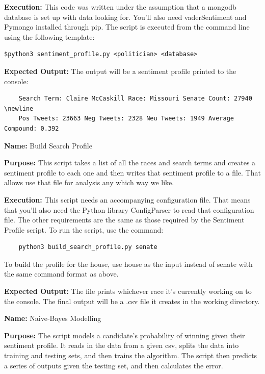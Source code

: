\documentclass[11pt, twoside, reqno]{book}
\begin{document}
\begin{appendices}
\textbf{Execution:} This code was written under the assumption that a mongodb database is set up with data looking for. You'll also need vaderSentiment and Pymongo installed through pip. The script is executed from the command line using the following template:
\begin{verbatim}
$python3 sentiment_profile.py <politician> <database>
\end{verbatim}

\textbf{Expected Output:} The output will be a sentiment profile printed to the console:
\begin{verbatim}
	Search Term: Claire McCaskill Race: Missouri Senate Count: 27940 \newline 
	Pos Tweets: 23663 Neg Tweets: 2328 Neu Tweets: 1949 Average Compound: 0.392
\end{verbatim}



\textbf{Name:} Build Search Profile

\textbf{Purpose:} This script takes a list of all the races and search terms and creates a sentiment profile to each one and then writes that sentiment profile to a file. That allows use that file for analysis any which way we like. 

\textbf{Execution:} This script needs an accompanying configuration file. That means that you'll also need the Python library ConfigParser to read that configuration file. The other requirements are the same as those required by the Sentiment Profile script. To run the script, use the command:
\begin{verbatim}
	python3 build_search_profile.py senate
\end{verbatim}
To build the profile for the house, use house as the input instead of senate with the same command format as above. 

\textbf{Expected Output:} The file prints whichever race it's currently working on to the console. The final output will be a .csv file it creates in the working directory. 



\textbf{Name:} Naive-Bayes Modelling

\textbf{Purpose:} The script models a candidate's probability of winning given their sentiment profile. It reads in the data from a given csv, splits the data into training and testing sets, and then trains the algorithm. The script then predicts a series of outputs given the testing set, and then calculates the error. 


\end{appendices}
\end{document}
